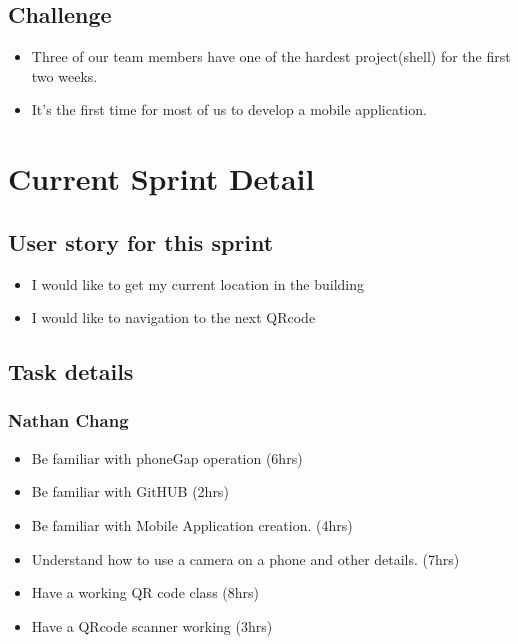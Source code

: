 \documentclass[12pt]{article}
\begin{document}
\subsection{Challenge}

\begin{itemize}
\item Three of our team members have one of the hardest project(shell) for the first two weeks.
\item It's the first time for most of us to develop a mobile application.
\end{itemize}

\section{Current Sprint Detail}

\subsection{User story for this sprint}

\begin{itemize}
\item I would like to get my current location in the building
\item I would like to navigation to the next QRcode

\end{itemize}

\subsection{Task details}
\subsubsection*{Nathan Chang}
\begin{itemize}
\item Be familiar with phoneGap operation (6hrs)
\item Be familiar with GitHUB (2hrs)
\item Be familiar with Mobile Application creation. (4hrs)
\item Understand how to use a camera on a phone and other details. (7hrs)
\item Have a working QR code class (8hrs)
\item Have a QRcode scanner working   (3hrs)
\end{itemize}
\end{document}
